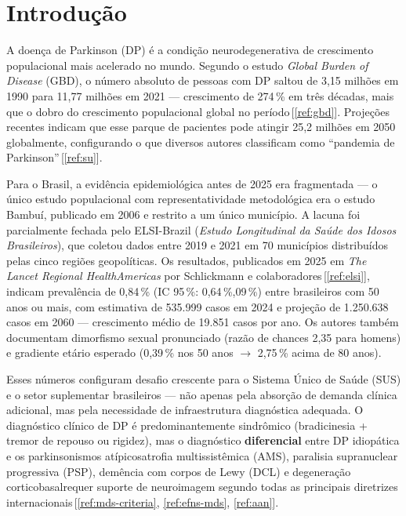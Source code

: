\documentclass[12pt,a4paper,oneside]{article}
\begin{document}
\newpage

\renewcommand{\contentsname}{Sumário}
\tableofcontents

\newpage
\renewcommand{\listfigurename}{Lista de Figuras}
\listoffigures

\vspace{1cm}
\renewcommand{\listtablename}{Lista de Tabelas}
\listoftables

\newpage

\section{Introdução}\label{sec:intro}

A doença de Parkinson (DP) é a condição neurodegenerativa de
crescimento populacional mais acelerado no mundo. Segundo o estudo
\textit{Global Burden of Disease} (GBD), o número absoluto de
pessoas com DP saltou de 3,15 milhões em 1990 para 11,77 milhões em
2021 — crescimento de 274\,\% em três décadas, mais que o dobro do
crescimento populacional global no
período\,[\ref{ref:gbd}]. Projeções recentes indicam que esse parque
de pacientes pode atingir 25,2 milhões em 2050 globalmente,
configurando o que diversos autores classificam como
``pandemia de Parkinson''\,[\ref{ref:su}].

Para o Brasil, a evidência epidemiológica antes de 2025 era
fragmentada — o único estudo populacional com representatividade
metodológica era o estudo Bambuí, publicado em 2006 e restrito a um
único município. A lacuna foi parcialmente fechada pelo
ELSI-Brazil (\textit{Estudo Longitudinal da Saúde dos Idosos
Brasileiros}), que coletou dados entre 2019 e 2021 em 70
municípios distribuídos pelas cinco regiões geopolíticas. Os
resultados, publicados em 2025 em \textit{The Lancet Regional
Health\textendash Americas} por Schlickmann e
colaboradores\,[\ref{ref:elsi}], indicam prevalência de 0,84\,\%
(IC 95\,\%: 0,64\,\%,09\,\%) entre brasileiros com 50
anos ou mais, com estimativa de 535.999 casos em 2024 e projeção
de 1.250.638 casos em 2060 — crescimento médio de 19.851 casos por
ano. Os autores também documentam dimorfismo sexual pronunciado
(razão de chances 2,35 para homens) e gradiente etário esperado
(0,39\,\% nos 50 anos $\rightarrow$ 2,75\,\% acima de
80 anos).

Esses números configuram desafio crescente para o Sistema Único de
Saúde (SUS) e o setor suplementar brasileiros — não apenas pela
absorção de demanda clínica adicional, mas pela necessidade de
infraestrutura diagnóstica adequada. O diagnóstico clínico de DP é
predominantemente sindrômico (bradicinesia + tremor de repouso ou
rigidez), mas o diagnóstico \textbf{diferencial} entre DP idiopática
e os parkinsonismos atípicos\textemdash{}atrofia multissistêmica
(AMS), paralisia supranuclear progressiva (PSP), demência com corpos
de Lewy (DCL) e degeneração corticobasal\textemdash{}requer suporte
de neuroimagem segundo todas as principais diretrizes
internacionais\,[\ref{ref:mds-criteria}, \ref{ref:efns-mds},
\ref{ref:aan}].
\end{document}
